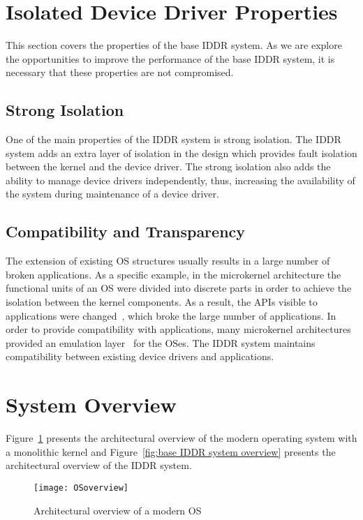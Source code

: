 \section{Isolated Device Driver Properties}
\label{sec:properties}
This section covers the properties of the base IDDR system. As we are explore the opportunities to improve the performance of the base IDDR system, it is necessary that these properties are not compromised.

\subsection*{Strong Isolation}
One of the main properties of the IDDR system is strong isolation. The IDDR system adds an extra layer of isolation in the design which provides fault isolation between the kernel and the device driver. The strong isolation also adds the ability to manage device drivers independently, thus, increasing the availability of the system during maintenance of a device driver.

\subsection*{Compatibility and Transparency} 
The extension of existing OS structures usually results in a large number of broken applications. As a specific example, in the microkernel architecture the functional units of an OS were divided into discrete parts in order to achieve the isolation between the kernel components. As a result, the APIs visible to applications were changed~\cite{hand2005virtual}, which broke the large number of applications. In order to provide compatibility with applications, many microkernel architectures provided an emulation layer~\cite{hand2005virtual} for the OSes. The IDDR system maintains compatibility between existing device drivers and applications.

\section{System Overview}\label{overview}

Figure~\ref{fig:monolithic} presents the architectural overview of the modern operating system with a monolithic kernel and Figure~\ref{fig:base IDDR system overview} presents the architectural overview of the IDDR system.
\\[3mm]
\begin{figure}[!ht]
\centering
\texttt{[image: OSoverview]}
\caption{Architectural overview of a modern OS}
\label{fig:monolithic}
\end{figure}

